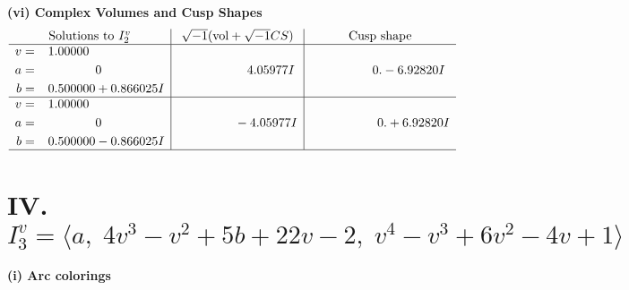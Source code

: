 \documentclass[1p]{elsarticle_modified}
\theoremstyle{definition}
\newcommand{\I}{\sqrt{-1}}
\begin{document}
\newpage\flushleft \textbf{(vi) Complex Volumes and Cusp Shapes}
$$\begin{array}{c|c|c}  
\text{Solutions to }I^v_{2}& \I (\text{vol} + \sqrt{-1}CS) & \text{Cusp shape}\\
 \hline 
\begin{aligned}
v &= \phantom{-}1.00000\phantom{ +0.000000I} \\
a &= \phantom{-0.000000 } 0 \\
b &= \phantom{-}0.500000 + 0.866025 I\end{aligned}
 & \phantom{-0.000000 -}4.05977 I & \phantom{-0.000000 } 0. - 6.92820 I \\ \hline\begin{aligned}
v &= \phantom{-}1.00000\phantom{ +0.000000I} \\
a &= \phantom{-0.000000 } 0 \\
b &= \phantom{-}0.500000 - 0.866025 I\end{aligned}
 & \phantom{-0.000000 } -4.05977 I & \phantom{-0.000000 -}0. + 6.92820 I\\
 \hline 
 \end{array}$$\newpage\newpage\renewcommand{\arraystretch}{1}
\centering \section*{IV. $I^v_{3}= \langle a,\;4 v^3- v^2+5 b+22 v-2,\;v^4- v^3+6 v^2-4 v+1 \rangle$}
\flushleft \textbf{(i) Arc colorings}\\
\end{document}
